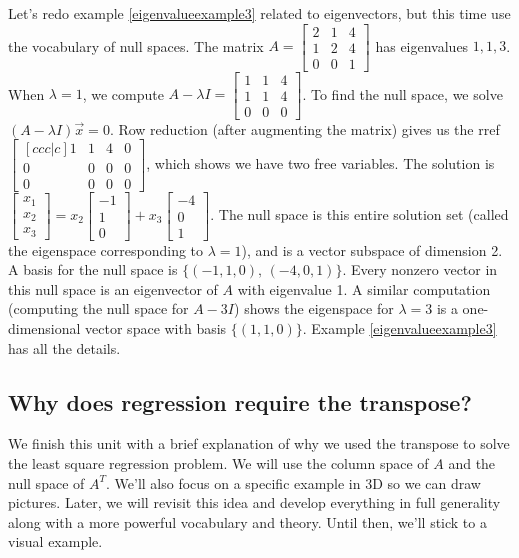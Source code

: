 \begin{example}
Let's redo example \ref{eigenvalueexample3} related to eigenvectors, but this time use the vocabulary of null spaces.  
The matrix 
$A=\begin{bmatrix}2&1&4\\ 1&2&4\\ 0&0&1\end{bmatrix}$ has eigenvalues $1,1,3$. 
When $\lambda=1$, we compute $A-\lambda I =\begin{bmatrix}1&1&4\\ 1&1&4\\ 0&0&0\end{bmatrix} $. To find the null space, we solve $(A-\lambda I )\vec x=0$. Row reduction (after augmenting the matrix) gives us the rref $\begin{bmatrix}[ccc|c]1&1&4&0\\ 0&0&0&0\\ 0&0&0&0\end{bmatrix}$, which shows we have two free variables. The solution is $\begin{bmatrix} x_1\\x_2\\ x_3\end{bmatrix} = x_2\begin{bmatrix} -1\\1\\0\end{bmatrix}+x_3\begin{bmatrix} -4\\0\\1\end{bmatrix} $. The null space is this entire solution set (called the eigenspace corresponding to $\lambda = 1$), and is a vector subspace of dimension 2. A basis for the null space is $\{(-1,1,0),\,(-4,0,1)\}$.
Every nonzero vector in this null space is an eigenvector of $A$ with eigenvalue 1.  A similar computation (computing the null space for $A-3I$) shows the eigenspace for $\lambda = 3$ is a one-dimensional vector space with basis $\{(1,1,0)\}$. Example \ref{eigenvalueexample3} has all the details.
\end{example}



\subsection{Why does regression require the transpose?}
We finish this unit with a brief explanation of why we used the transpose to solve the least square regression problem.  We will use the column space of $A$ and the null space of $A^T$. We'll also focus on a specific example in 3D so we can draw pictures.  Later,  we will revisit this idea and develop everything in full generality along with a more powerful vocabulary and theory.  Until then, we'll stick to a visual example.

